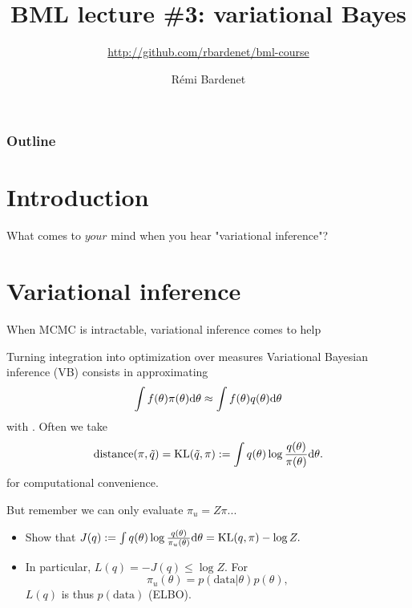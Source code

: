 \documentclass[10pt]{beamer}
\title[Bayesian ML: Bayesics]{BML lecture \#3: variational Bayes}
\subtitle{\url{http://github.com/rbardenet/bml-course}}
\author[Rémi Bardenet (CNRS \& Univ. Lille)] %
{Rémi Bardenet}
\institute[] %
{
  CNRS \& CRIStAL, Univ. Lille, France\\
\vspace{1cm}
\texttt{[image: /Users/rbardenet/Work/Tex/PosterImages/logoCNRS.pdf]}
\qquad \texttt{[image: /Users/rbardenet/Work/Tex/PosterImages/cristalLogo.pdf]}
}
\date{}
\begin{document}
\begin{frame}
\maketitle
\end{frame}

\begin{frame}
\frametitle{Outline}
\tableofcontents
\end{frame}

\section{Introduction}

\begin{frame}{What comes to $your$ mind when you hear "variational inference"?}
\end{frame}

\section{Variational inference}
\begin{frame}{When MCMC is intractable, variational inference comes to help}
\begin{block}{Turning integration into optimization over measures}
Variational Bayesian inference (VB) consists in approximating
$$ \int f(\theta)\pi(\theta){\rm d}\theta \approx \int f(\theta)q(\theta){\rm d}\theta$$
with . Often we take
$$
\text{distance}(\pi, \tilde q) = \text{KL}(\tilde q, \pi) := \int q(\theta) \log \frac{q(\theta)}{\pi(\theta)}{\rm d}\theta.
$$
for computational convenience.
\end{block}
\blank
\end{frame}

\begin{frame}{But remember we can only evaluate $\pi_u = Z\pi$...}
\begin{itemize}
\item Show that $J(q) := \int q(\theta) \log \frac{q(\theta)}{\pi_u(\theta)}{\rm d}\theta = \text{KL}(q, \pi) - \log Z.$
\blank
\item In particular, $L(q) = -J(q) \leq \log Z$. For
$$
\pi_u(\theta) = p(\text{data}\vert\theta) p(\theta),
$$
$L(q)$ is thus  $p(\text{data})$ (ELBO).
\end{itemize}
\end{frame}
\end{document}
